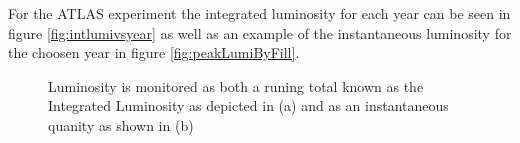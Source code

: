For the ATLAS experiment the integrated luminosity for each year can be seen in
figure \ref{fig:intlumivsyear} as well as an example of the instantaneous luminosity for the choosen
year in figure \ref{fig:peakLumiByFill}.

\begin{figure}[!htbp] 
\centering
{}\hfill
{}\hfill
\caption{Luminosity is monitored as both a runing total known as the Integrated
Luminosity as depicted in (a) and as an instantaneous quanity as shown in (b)}
\label{fig:luminosity} 
\end{figure}


